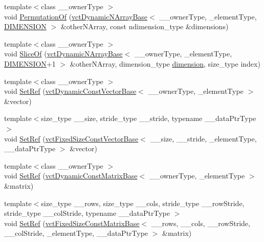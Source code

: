\begin{DoxyCompactItemize}
\item 
{\footnotesize template$<$class \+\_\+\+\_\+owner\+Type $>$ }\\void \hyperlink{classvct_dynamic_n_array_ref_a45d4d5d388c223ee718751d8d539ec9f}{Permutation\+Of} (\hyperlink{classvct_dynamic_n_array_base}{vct\+Dynamic\+N\+Array\+Base}$<$ \+\_\+\+\_\+owner\+Type, \+\_\+element\+Type, \hyperlink{group__cisst_vector_gga92161a3e7a42576d3442eaf7bae097c1aa639cdab72a595c9cb324af98946bab5}{D\+I\+M\+E\+N\+S\+I\+O\+N} $>$ \&other\+N\+Array, const ndimension\+\_\+type \&dimensions)
\item 
{\footnotesize template$<$class \+\_\+\+\_\+owner\+Type $>$ }\\void \hyperlink{classvct_dynamic_n_array_ref_a85f74df442f837c625d2307878e193ef}{Slice\+Of} (\hyperlink{classvct_dynamic_n_array_base}{vct\+Dynamic\+N\+Array\+Base}$<$ \+\_\+\+\_\+owner\+Type, \+\_\+element\+Type, \hyperlink{group__cisst_vector_gga92161a3e7a42576d3442eaf7bae097c1aa639cdab72a595c9cb324af98946bab5}{D\+I\+M\+E\+N\+S\+I\+O\+N}+1 $>$ \&other\+N\+Array, dimension\+\_\+type \hyperlink{classvct_dynamic_const_n_array_base_aad976ad48dc9b1006d9e2729195f0b7c}{dimension}, size\+\_\+type index)
\item 
{\footnotesize template$<$class \+\_\+\+\_\+owner\+Type $>$ }\\void \hyperlink{classvct_dynamic_n_array_ref_ae0ece57aea479868bf10bc2eda6192fc}{Set\+Ref} (\hyperlink{classvct_dynamic_const_vector_base}{vct\+Dynamic\+Const\+Vector\+Base}$<$ \+\_\+\+\_\+owner\+Type, \+\_\+element\+Type $>$ \&vector)
\item 
{\footnotesize template$<$size\+\_\+type \+\_\+\+\_\+size, stride\+\_\+type \+\_\+\+\_\+stride, typename \+\_\+\+\_\+data\+Ptr\+Type $>$ }\\void \hyperlink{classvct_dynamic_n_array_ref_a4e0d19a8a0ffa5b6e70f862075b2a093}{Set\+Ref} (\hyperlink{classvct_fixed_size_const_vector_base}{vct\+Fixed\+Size\+Const\+Vector\+Base}$<$ \+\_\+\+\_\+size, \+\_\+\+\_\+stride, \+\_\+element\+Type, \+\_\+\+\_\+data\+Ptr\+Type $>$ \&vector)
\item 
{\footnotesize template$<$class \+\_\+\+\_\+owner\+Type $>$ }\\void \hyperlink{classvct_dynamic_n_array_ref_a39f95f35d4e4b341745e56037dc09db5}{Set\+Ref} (\hyperlink{classvct_dynamic_const_matrix_base}{vct\+Dynamic\+Const\+Matrix\+Base}$<$ \+\_\+\+\_\+owner\+Type, \+\_\+element\+Type $>$ \&matrix)
\item 
{\footnotesize template$<$size\+\_\+type \+\_\+\+\_\+rows, size\+\_\+type \+\_\+\+\_\+cols, stride\+\_\+type \+\_\+\+\_\+row\+Stride, stride\+\_\+type \+\_\+\+\_\+col\+Stride, typename \+\_\+\+\_\+data\+Ptr\+Type $>$ }\\void \hyperlink{classvct_dynamic_n_array_ref_a5e7f95e471582d00ed6a46221dc63d85}{Set\+Ref} (\hyperlink{classvct_fixed_size_const_matrix_base}{vct\+Fixed\+Size\+Const\+Matrix\+Base}$<$ \+\_\+\+\_\+rows, \+\_\+\+\_\+cols, \+\_\+\+\_\+row\+Stride, \+\_\+\+\_\+col\+Stride, \+\_\+element\+Type, \+\_\+\+\_\+data\+Ptr\+Type $>$ \&matrix)

\end{DoxyCompactItemize}
